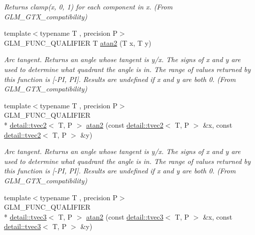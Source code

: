 \begin{DoxyCompactItemize}
\begin{DoxyCompactList}\small\item\em Returns clamp(x, 0, 1) for each component in x. (From G\-L\-M\-\_\-\-G\-T\-X\-\_\-compatibility) \end{DoxyCompactList}\item 
\hypertarget{group__gtx__compatibility_gac63011205bf6d0be82589dc56dd26708}{{\footnotesize template$<$typename T , precision P$>$ }\\G\-L\-M\-\_\-\-F\-U\-N\-C\-\_\-\-Q\-U\-A\-L\-I\-F\-I\-E\-R T \hyperlink{group__gtx__compatibility_gac63011205bf6d0be82589dc56dd26708}{atan2} (T x, T y)}\label{group__gtx__compatibility_gac63011205bf6d0be82589dc56dd26708}

\begin{DoxyCompactList}\small\item\em Arc tangent. Returns an angle whose tangent is y/x. The signs of x and y are used to determine what quadrant the angle is in. The range of values returned by this function is \mbox{[}-\/\-P\-I, P\-I\mbox{]}. Results are undefined if x and y are both 0. (From G\-L\-M\-\_\-\-G\-T\-X\-\_\-compatibility) \end{DoxyCompactList}\item 
\hypertarget{group__gtx__compatibility_ga9947ea1e628e2823b9276924445e0147}{{\footnotesize template$<$typename T , precision P$>$ }\\G\-L\-M\-\_\-\-F\-U\-N\-C\-\_\-\-Q\-U\-A\-L\-I\-F\-I\-E\-R \\*
\hyperlink{structglm_1_1detail_1_1tvec2}{detail\-::tvec2}$<$ T, P $>$ \hyperlink{group__gtx__compatibility_ga9947ea1e628e2823b9276924445e0147}{atan2} (const \hyperlink{structglm_1_1detail_1_1tvec2}{detail\-::tvec2}$<$ T, P $>$ \&x, const \hyperlink{structglm_1_1detail_1_1tvec2}{detail\-::tvec2}$<$ T, P $>$ \&y)}\label{group__gtx__compatibility_ga9947ea1e628e2823b9276924445e0147}

\begin{DoxyCompactList}\small\item\em Arc tangent. Returns an angle whose tangent is y/x. The signs of x and y are used to determine what quadrant the angle is in. The range of values returned by this function is \mbox{[}-\/\-P\-I, P\-I\mbox{]}. Results are undefined if x and y are both 0. (From G\-L\-M\-\_\-\-G\-T\-X\-\_\-compatibility) \end{DoxyCompactList}\item 
\hypertarget{group__gtx__compatibility_gac457f8819be9cd8e3f42be17451b750a}{{\footnotesize template$<$typename T , precision P$>$ }\\G\-L\-M\-\_\-\-F\-U\-N\-C\-\_\-\-Q\-U\-A\-L\-I\-F\-I\-E\-R \\*
\hyperlink{structglm_1_1detail_1_1tvec3}{detail\-::tvec3}$<$ T, P $>$ \hyperlink{group__gtx__compatibility_gac457f8819be9cd8e3f42be17451b750a}{atan2} (const \hyperlink{structglm_1_1detail_1_1tvec3}{detail\-::tvec3}$<$ T, P $>$ \&x, const \hyperlink{structglm_1_1detail_1_1tvec3}{detail\-::tvec3}$<$ T, P $>$ \&y)}\label{group__gtx__compatibility_gac457f8819be9cd8e3f42be17451b750a}


\end{DoxyCompactItemize}
